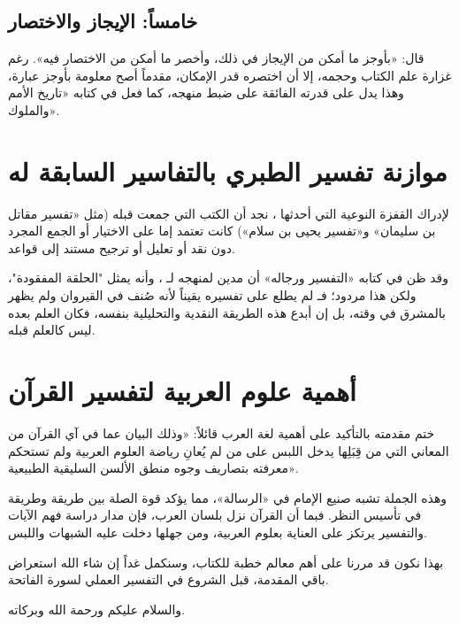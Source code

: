 \subsection{خامساً: الإيجاز والاختصار}
قال: «بأوجز ما أمكن من الإيجاز في ذلك، وأخصر ما أمكن من الاختصار فيه». رغم غزارة علم الكتاب وحجمه، إلا أن  اختصره قدر الإمكان، مقدماً أصح معلومة بأوجز عبارة، وهذا يدل على قدرته الفائقة على ضبط منهجه، كما فعل في كتابه «تاريخ الأمم والملوك».

\separator

\section{موازنة تفسير الطبري بالتفاسير السابقة له}
لإدراك القفزة النوعية التي أحدثها ، نجد أن الكتب التي جمعت قبله (مثل «تفسير مقاتل بن سليمان» و«تفسير يحيى بن سلام») كانت تعتمد إما على الاختيار أو الجمع المجرد دون نقد أو تعليل أو ترجيح مستند إلى قواعد. 

وقد ظن  في كتابه «التفسير ورجاله» أن  مدين لمنهجه لـ ، وأنه يمثل "الحلقة المفقودة"، ولكن هذا مردود؛ فـ  لم يطلع على تفسيره يقيناً لأنه صُنف في القيروان ولم يظهر بالمشرق في وقته، بل إن  أبدع هذه الطريقة النقدية والتحليلية بنفسه، فكان العلم بعده ليس كالعلم قبله.

\section{أهمية علوم العربية لتفسير القرآن}
ختم  مقدمته بالتأكيد على أهمية لغة العرب قائلاً: «وذلك البيان عما في آي القرآن من المعاني التي من قِبَلِها يدخل اللبس على من لم يُعانِ رياضة العلوم العربية ولم تستحكم معرفته بتصاريف وجوه منطق الألسن السليقية الطبيعية».

وهذه الجملة تشبه صنيع الإمام  في «الرسالة»، مما يؤكد قوة الصلة بين طريقة  وطريقة  في تأسيس النظر. فبما أن القرآن نزل بلسان العرب، فإن مدار دراسة فهم الآيات والتفسير يرتكز على العناية بعلوم العربية، ومن جهلها دخلت عليه الشبهات واللبس.

\separator

بهذا نكون قد مررنا على أهم معالم خطبة  للكتاب، وسنكمل غداً إن شاء الله استعراض باقي المقدمة، قبل الشروع في التفسير العملي لسورة الفاتحة.

والسلام عليكم ورحمة الله وبركاته.
